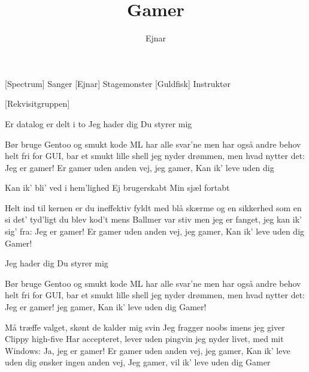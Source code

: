 \documentclass[a4paper,11pt]{article}
\title{Gamer}
\author{Ejnar}
\begin{document}
\maketitle

\begin{roles}
[Spectrum] Sanger
[Ejnar] Stagemonster
[Guldfisk] Instruktør
\end{roles}

\begin{props}
[Rekvisitgruppen]
\end{props}

\begin{song}

 Er datalog
er delt i to
Jeg hader dig
Du styrer mig

Bør bruge Gentoo og smukt kode ML
har alle svar'ne men har også andre behov
helt fri for GUI, bar et smukt lille shell
jeg nyder drømmen, men hvad nytter det: Jeg er gamer!
Er gamer uden anden vej,
jeg gamer,
Kan ik' leve uden dig

Kan ik' bli' ved
i hem'lighed
Ej brugerskabt
Min sjæl fortabt

Helt ind til kernen er du ineffektiv
fyldt med blå skærme og en sikkerhed som en si
det' tyd'ligt du blev kod't mens Ballmer var stiv
men jeg er fanget, jeg kan ik' sig' fra: Jeg er gamer!
Er gamer uden anden vej,
jeg gamer,
Kan ik' leve uden dig
Gamer!

Jeg hader dig
Du styrer mig

Bør bruge Gentoo og smukt kode ML
har alle svar'ne men har også andre behov
helt fri for GUI, bar et smukt lille shell
jeg nyder drømmen, men hvad nytter det: Jeg er gamer!
jeg gamer,
Kan ik' leve uden dig
Gamer!

Må træffe valget, skønt de kalder mig svin
Jeg fragger noobs imens jeg giver Clippy high-five
Har accepteret, lever uden pingvin
jeg nyder livet, med mit Windows: Ja, jeg er gamer!
Er gamer uden anden vej,
jeg gamer,
Kan ik' leve uden dig
ønsker ingen anden vej,
Jeg gamer,
vil ik' leve uden dig
Gamer

\end{song}
\end{document}
